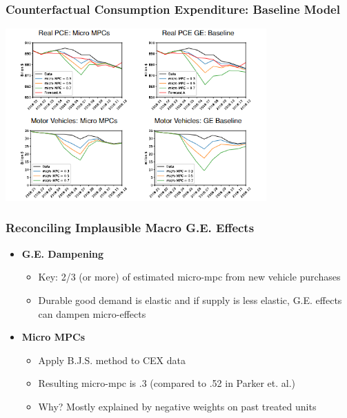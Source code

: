 \documentclass[english,xcolor=svgnames]{beamer}
\begin{document}
\begin{frame}[label=baselinenominal]
\frametitle{Counterfactual Consumption Expenditure: Baseline Model}

\begin{center}
\footnotesize
\centering

    \includegraphics[width=10cm]{figures/macro_counterfactual_baseline}
 \end{center} 
  \vspace{-0.5cm}
\end{frame}

\begin{frame}
\frametitle{Reconciling Implausible Macro G.E. Effects}

\begin{itemize}
	\item \textbf{G.E. Dampening}
		\begin{itemize}
		\item Key: 2/3 (or more) of estimated micro-mpc from new vehicle purchases
		\item Durable good demand is elastic and if supply is less elastic, G.E. effects can dampen micro-effects
		\end{itemize}
		
\item \textbf{Micro MPCs}
	\begin{itemize}
		\item Apply B.J.S. method to CEX data
		\item Resulting micro-mpc is .3 (compared to .52 in Parker et. al.)
		\item Why? Mostly explained by negative weights on past treated units
	\end{itemize}
\end{itemize}

\end{frame}
\end{document}
